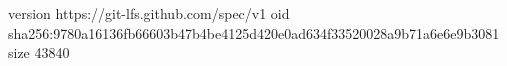 version https://git-lfs.github.com/spec/v1
oid sha256:9780a16136fb66603b47b4be4125d420e0ad634f33520028a9b71a6e6e9b3081
size 43840

